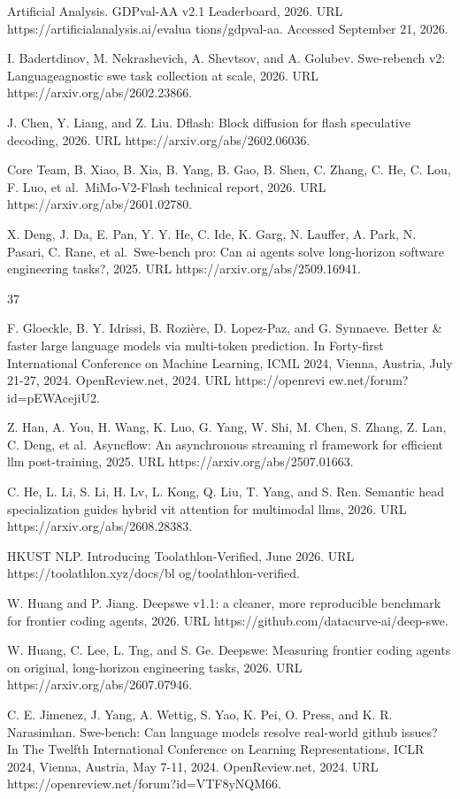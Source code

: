 \documentclass[
  10
]{article}
\begin{document}
Artificial Analysis. GDPval-AA v2.1 Leaderboard, 2026. URL
https://artificialanalysis.ai/evalua tions/gdpval-aa. Accessed September
21, 2026.

I. Badertdinov, M. Nekrashevich, A. Shevtsov, and A. Golubev.
Swe-rebench v2: Languageagnostic swe task collection at scale, 2026. URL
https://arxiv.org/abs/2602.23866.

J. Chen, Y. Liang, and Z. Liu. Dflash: Block diffusion for flash
speculative decoding, 2026. URL https://arxiv.org/abs/2602.06036.

Core Team, B. Xiao, B. Xia, B. Yang, B. Gao, B. Shen, C. Zhang, C. He,
C. Lou, F. Luo, et al.~MiMo-V2-Flash technical report, 2026. URL
https://arxiv.org/abs/2601.02780.

X. Deng, J. Da, E. Pan, Y. Y. He, C. Ide, K. Garg, N. Lauffer, A. Park,
N. Pasari, C. Rane, et al.~Swe-bench pro: Can ai agents solve
long-horizon software engineering tasks?, 2025. URL
https://arxiv.org/abs/2509.16941.

37

F. Gloeckle, B. Y. Idrissi, B. Rozière, D. Lopez-Paz, and G. Synnaeve.
Better \& faster large language models via multi-token prediction. In
Forty-first International Conference on Machine Learning, ICML 2024,
Vienna, Austria, July 21-27, 2024. OpenReview.net, 2024. URL
https://openrevi ew.net/forum?id=pEWAcejiU2.

Z. Han, A. You, H. Wang, K. Luo, G. Yang, W. Shi, M. Chen, S. Zhang, Z.
Lan, C. Deng, et al.~Asyncflow: An asynchronous streaming rl framework
for efficient llm post-training, 2025. URL
https://arxiv.org/abs/2507.01663.

C. He, L. Li, S. Li, H. Lv, L. Kong, Q. Liu, T. Yang, and S. Ren.
Semantic head specialization guides hybrid vit attention for multimodal
llms, 2026. URL https://arxiv.org/abs/2608.28383.

HKUST NLP. Introducing Toolathlon-Verified, June 2026. URL
https://toolathlon.xyz/docs/bl og/toolathlon-verified.

W. Huang and P. Jiang. Deepswe v1.1: a cleaner, more reproducible
benchmark for frontier coding agents, 2026. URL
https://github.com/datacurve-ai/deep-swe.

W. Huang, C. Lee, L. Tng, and S. Ge. Deepswe: Measuring frontier coding
agents on original, long-horizon engineering tasks, 2026. URL
https://arxiv.org/abs/2607.07946.

C. E. Jimenez, J. Yang, A. Wettig, S. Yao, K. Pei, O. Press, and K. R.
Narasimhan. Swe-bench: Can language models resolve real-world github
issues? In The Twelfth International Conference on Learning
Representations, ICLR 2024, Vienna, Austria, May 7-11, 2024.
OpenReview.net, 2024. URL https://openreview.net/forum?id=VTF8yNQM66.
\end{document}
